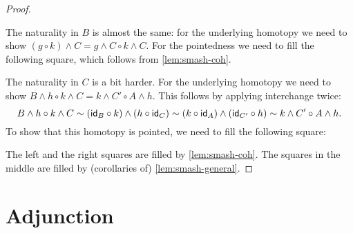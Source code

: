 \documentclass{article}
\renewcommand{\smash}{\wedge}
\renewcommand{\o}{\ensuremath{\circ}}
\begin{document}
\begin{proof}
\begin{center}
\end{center}
The naturality in $B$ is almost the same: for the underlying homotopy we need to show
$(g \o k)\smash C = g\smash C \o k\smash C$. For the pointedness we need to fill the following
square, which follows from \autoref{lem:smash-coh}.
\begin{center}
\end{center}
The naturality in $C$ is a bit harder. For the underlying homotopy we need to show
$B\smash h\o k\smash C=k\smash C'\o A\smash h$. This follows by applying interchange twice:
$$B\smash h\o k\smash C\sim(\idfunc[B]\o k)\smash(h\o\idfunc[C])\sim(k\o\idfunc[A])\smash(\idfunc[C']\o h)\sim k\smash C'\o A\smash h.$$
To show that this homotopy is pointed, we need to fill the following square:
\begin{center}
\end{center}
The left and the right squares are filled by \autoref{lem:smash-coh}. The squares in the middle
are filled by (corollaries of) \autoref{lem:smash-general}.
\end{proof}

\section{Adjunction}
\end{document}
